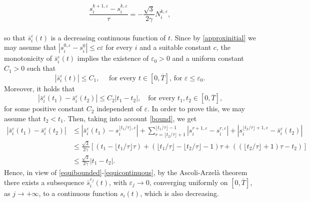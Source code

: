 \documentclass{interact}
\numberwithin{equation}{section}
\theoremstyle{definition}
\renewcommand{\epsilon}{\varepsilon}
\begin{document}
\begin{equation}
\frac{s_i^{k+1,\epsilon}-s_i^{k,\epsilon}}{\tau}=-\frac{\sqrt3}{2\gamma}N_{i}^{k,\epsilon},
\label{bound}
\end{equation}
\\
so that $\bar{s}_i^\epsilon(t)$ is a decreasing continuous function of $t$. Since by \eqref{approxinitial} we may assume that $|s_i^{0,\epsilon}- s_i^0|\leq c\epsilon$ for every $i$ and a suitable constant $c$, the monotonicity of $\bar{s}_i^\epsilon(t)$ implies the existence of $\epsilon_0>0$ and a uniform constant $C_1>0$ such that
\begin{equation}
|\bar{s}_i^\epsilon(t)|\leq C_1,\quad \mbox{ for every $t\in[0,\overline{T}]$, for $\epsilon\leq\epsilon_0$.}
\label{equibounded}
\end{equation} 
Moreover, it holds that
\begin{equation}
|\bar{s}_i^\epsilon(t_1)-\bar{s}_i^\epsilon(t_2)|\leq C_2 |t_1-t_2|,\quad \mbox{for every $t_1,t_2\in[0,\overline{T}]$,}
\label{equicontinuous}
\end{equation}
for some positive constant $C_2$ independent of $\epsilon$. In order to prove this, we may assume that $t_2<t_1$. Then, taking into account \eqref{bound}, we get
\begin{equation*}
\begin{split}
|\bar{s}_i^\epsilon(t_1)-\bar{s}_i^\epsilon(t_2)| & \leq |\bar{s}_i^\epsilon(t_1)-s_i^{\lfloor t_1/\tau\rfloor,\epsilon}|+\sum_{r=\lfloor t_2/\tau\rfloor+1}^{\lfloor t_1/\tau\rfloor-1}|s_i^{r+1,\epsilon}-s_i^{r,\epsilon}| + |s_i^{\lfloor t_2/\tau\rfloor+1,\epsilon}-\bar{s}_i^\epsilon(t_2)|\\
&\leq \frac{\sqrt3}{2\gamma} \left[(t_1-\lfloor t_1/\tau\rfloor\tau)+ (\lfloor t_1/\tau\rfloor-\lfloor t_2/\tau\rfloor-1)\tau+ ((\lfloor t_2/\tau\rfloor+1)\tau-t_2)\right]\\
&\leq \frac{\sqrt3}{2\gamma}|t_1-t_2|.
\end{split}
\end{equation*}
Hence, in view of \eqref{equibounded}-\eqref{equicontinuous}, by the Ascoli-Arzel\`a theorem there exists a subsequence $\bar{s}_i^{\epsilon_j}(t)$, with $\epsilon_j\to0$, converging uniformly on $[0,\overline{T}]$, as $j\to+\infty$, to a continuous function $s_i(t)$, which is also decreasing. %
\end{document}
